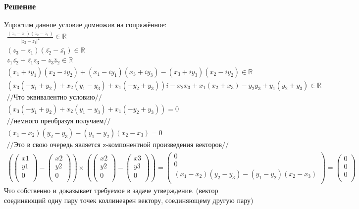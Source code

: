\documentclass{article}
\newcommand{\R}{\mathbb{R}}
\begin{document}
\subsubsection*{Решение}
Упростим данное условие домножив на сопряжённое:
\begin{gather*}
    \frac{(z_3-z_1)(\bar{z_2}-\bar{z_1})}{|z_2-z_1|^2} \in \R \\
    (z_3-z_1)(\bar{z_2}-\bar{z_1}) \in \R \\
    z_1 \bar{z_2} + \bar {z_1} z_3 - z_3 \bar z_2 \in \R\\
    (x_1+i y_1) (x_2 - i y_2) + (x_1-iy_1)(x_3+iy_3)-(x_3+iy_3)(x_2-iy_2) \in \R \\
    (x_3 (-y_1 + y_2) + x_2 (y_1 - y_3) + x_1 (-y_2 + y_3))i -x_2 x_3 + x_1 (x_2 + x_3) - y_2 y_3 + y_1 (y_2 + y_3) \in \R\\
    \text{//Что эквивалентно условию//}\\
    (x_3 (-y_1 + y_2) + x_2 (y_1 - y_3) + x_1 (-y_2 + y_3)) = 0\\
     \text{//немного преобразуя получаем//}\\
     (x_1 - x_2) (y_2 - y_3) - (y_1 - y_2) (x_2 - x_3)=0\\
     \text{//Это в свою очередь является z-компонентной произведения векторов//}\\
    \left( \begin{pmatrix}
         x1\\   
         y1\\
         0\\
     \end{pmatrix} - \begin{pmatrix}
         x2\\   
         y2\\
         0\\
     \end{pmatrix} \right) \times 
     \left( \begin{pmatrix}
         x2\\   
         y2\\
         0\\
     \end{pmatrix} - \begin{pmatrix}
         x3\\   
         y3\\
         0\\
     \end{pmatrix} \right) = 
     \begin{pmatrix}
         0\\   
         0\\
         (x_1 - x_2) (y_2 - y_3) - (y_1 - y_2) (x_2 - x_3)\\
     \end{pmatrix} = 
     \begin{pmatrix}
         0\\   
         0\\
         0\\
     \end{pmatrix}
\end{gather*}
Что собственно и доказывает требуемое в задаче утверждение. (вектор соединяющий одну пару точек коллинеарен вектору, соединяющему другую пару)
\end{document}

